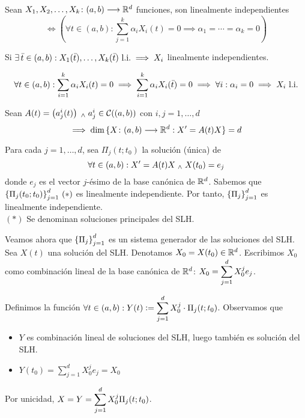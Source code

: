 \begin{defn}
	Sean $X_1, X_2, \ldots, X_k \colon (a, b) \longrightarrow \mathbb{R}^d$ funciones, son linealmente independientes
	\[\iff \left(\forall t \in (a, b) : \sum_{j=1}^{k} \alpha_i X_i (t) = 0 \implies \alpha_1 = \cdots = \alpha_k = 0 \right)\]
\end{defn}

\begin{prop}
	Si $\exists \, \Bar{t} \in (a,b) : X_1(\Bar{t}) , \dots , X_k(\Bar{t}) \text{ l.i.}\implies X_i$ linealmente independientes.
	\begin{dem}
		\[\forall t \in (a,b) : \sum_{i=1}^k \alpha_i X_i(t) = 0 \implies \sum_{i=1}^k \alpha_i X_i(\Bar{t}) = 0 \implies \forall i : \alpha_i = 0 \implies X_i  \text{ l.i.}\]
	\end{dem}
\end{prop}


\begin{prop}
	Sean $A(t) = \left(a^i_j(t)\right) \; _{\wedge} \; a^i_j \in \mathcal{C}((a,b))$ con $i,j=1,\ldots,d$
	\[\implies \dim{\{X \colon (a,b) \longrightarrow \mathbb{R}^d : X'=A(t)X\}} = d\]
	\begin{dem}
		Para cada $j=1, \dots, d$, sea $\Pi_j(t;t_0)$ la solución (única) de
		\[\forall t \in (a,b) : X'=A(t)X \; _{\wedge} \; X(t_0) = e_j\]
		donde $e_j$ es el vector $j$-ésimo de la base canónica de $\mathbb{R}^d$. Sabemos que $\displaystyle \left\{\Pi_j(t_0; t_0)\right\}_{j=1}^d \,(*)$ es linealmente independiente. Por tanto, $\displaystyle \left\{\Pi_j\right\}_{j=1}^d$ es linealmente independiente. \\
		\hspace*{\fill} $(*)$ Se denominan soluciones principales del SLH.

		Veamos ahora que $\displaystyle \left\{\Pi_j\right\}_{j=1}^d$ es un sistema generador de las soluciones del SLH. Sea $X(t)$ una solución del SLH. Denotamos $X_0=X(t_0) \in \mathbb{R}^d$. Escribimos $X_0$ como combinación lineal de la base canónica de $\mathbb{R}^d$: $\displaystyle X_0 = \sum_{j=1}^{d} X_0^j e_j$.

		Definimos la función $\displaystyle \forall t \in (a, b) : Y(t)\vcentcolon= \sum_{j=1}^{d} X_0^j \cdot \Pi_j(t;t_0)$. Observamos que
		\begin{itemize}
			\item $Y$ es combinación lineal de soluciones del SLH, luego también es solución del SLH.
			\item $Y(t_0) = \sum_{j=1}^{d} X_0^j e_j = X_0$
		\end{itemize}
		Por unicidad, $\displaystyle X = Y = \sum_{j=1}^{d} X_0^j \Pi_j(t;t_0)$.
	\end{dem}
\end{prop}

